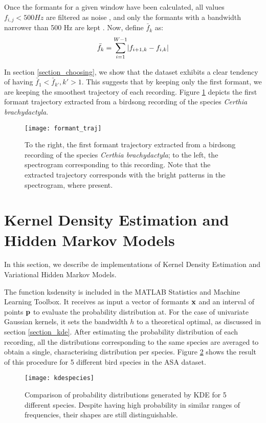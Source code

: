 \documentclass[../main.tex]{subfiles}
\begin{document}
\par Once the formants for a given window have been calculated, all values $f_{i, j} < 500 Hz$ are filtered as noise \cite{Stowell2014}, and only the formants with a bandwidth narrower than 500 Hz are kept \cite{Mathworks2015}. Now, define $\bar{f}_k$ as:
\begin{align*}
\bar{f}_k = \sum_{i=1}^{W-1} \lvert f_{i+1, k} - f_{i,k}\rvert
\end{align*}
\par In section \ref{section_choosing}, we show that the dataset exhibits a clear tendency of having $\bar{f}_1 < \bar{f}_{k'}, k'>1$. This suggests that by keeping only the first formant, we are keeping the smoothest trajectory of each recording. Figure \ref{fig_traj} depicts the first formant trajectory extracted from a birdsong recording of the species \emph{Certhia brachydactyla}.

\begin{figure}[t]
\centering
\texttt{[image: formant\_traj]}
\caption{To the right, the first formant trajectory extracted from a birdsong recording of the species \emph{Certhia brachydactyla}; to the left, the spectrogram corresponding to this recording. Note that the extracted trajectory corresponds with the bright patterns in the spectrogram, where present.}
\label{fig_traj}
\end{figure}

\section{Kernel Density Estimation and Hidden Markov Models} \label{section_imphmms}
In this section, we describe de implementations of Kernel Density Estimation and Variational Hidden Markov Models.
\par The function ksdensity is included in the MATLAB Statistics and Machine Learning Toolbox. It receives as input a vector of formants $\mathbf{x}$ and an interval of points $\mathbf{p}$ to evaluate the probability distribution at. For the case of univariate Gaussian kernels, it sets the bandwidth $h$ to a theoretical optimal, as discussed in section \ref{section_kde}. After estimating the probability distribution of each recording, all the distributions corresponding to the same species are averaged to obtain a single, characterising distribution per species. Figure \ref{fig_kdespecies} shows the result of this procedure for 5 different bird species in the ASA dataset.

\begin{figure}[t]
\centering
\texttt{[image: kdespecies]}
\caption{Comparison of probability distributions generated by KDE for 5 different species. Despite having high probability in similar ranges of frequencies, their shapes are still distinguishable. }
\label{fig_kdespecies}
\end{figure}
\end{document}
